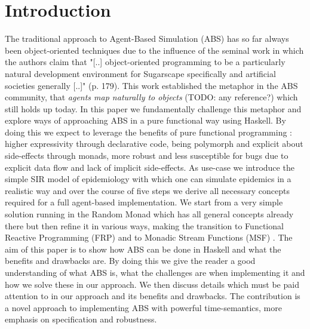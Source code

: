 \section{Introduction}
The traditional approach to Agent-Based Simulation (ABS) has so far always been object-oriented techniques due to the influence of the seminal work \cite{epstein_growing_1996} in which the authors claim that "[..] object-oriented programming to be a particularly natural development environment for Sugarscape specifically and artificial societies generally [..]" (p. 179). This work established the metaphor in the ABS community, that \textit{agents map naturally to objects} (TODO: any reference?) which still holds up today.
In this paper we fundamentally challenge this metaphor and explore ways of approaching ABS in a pure functional way using Haskell. By doing this we expect to leverage the benefits of pure functional programming \cite{hudak_history_2007}: higher expressivity through declarative code, being polymorph and explicit about side-effects through monads, more robust and less susceptible for bugs due to explicit data flow and lack of implicit side-effects.
As use-case we introduce the simple SIR model of epidemiology with which one can simulate epidemics in a realistic way and over the course of five steps we derive all necessary concepts required for a full agent-based implementation. We start from a very simple solution running in the Random Monad which has all general concepts already there but then refine it in various ways, making the transition to Functional Reactive Programming (FRP) \cite{wan_functional_2000} and to Monadic Stream Functions (MSF) \cite{perez_functional_2016}.
The aim of this paper is to show how ABS can be done in Haskell and what the benefits and drawbacks are. By doing this we give the reader a good understanding of what ABS is, what the challenges are when implementing it and how we solve these in our approach. We then discuss details which must be paid attention to in our approach and its benefits and drawbacks. The contribution is a novel approach to implementing ABS with powerful time-semantics, more emphasis on specification and robustness.